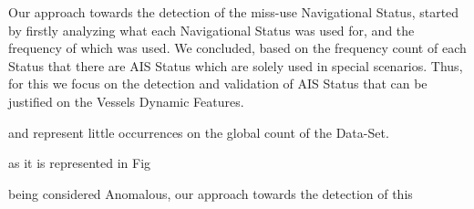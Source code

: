 Our approach towards the detection of the miss-use Navigational Status, started by firstly analyzing what each Navigational Status was used for, and the frequency of which was used. We concluded, based on the frequency count of each Status that there are AIS Status which are solely used in special scenarios. Thus, for this we focus on the detection and validation of AIS Status that can be justified on the Vessels Dynamic Features.

and represent little occurrences on the global count of the Data-Set.

as it is represented in Fig

being considered Anomalous, our approach towards the detection of this  









